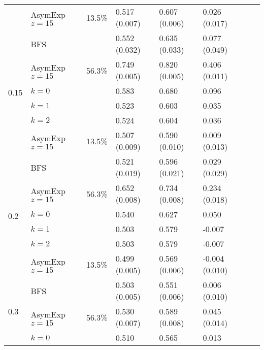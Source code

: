\documentclass[a4paper,final,notitlepage,11pt,svgnames]{scrartcl}
\begin{document}
\begin{table}[htpb]
\begin{tabular}{llllllll}
		                      & AsymExp $z=15$ & 13.5\%       & 0.517 (0.007) & 0.607 (0.006) & 0.026 (0.017)  &               &    \\
		\cmidrule(r){2-6}
		\multirow{6}{*}{0.15} & BFS            &              & 0.552 (0.032) & 0.635 (0.033) & 0.077 (0.049)  &               & \\
		                      & AsymExp $z=15$ & 56.3\%       & 0.749 (0.005) & 0.820 (0.005) & 0.406 (0.011)  &               &    \\
		                      & $k=0$          &              & 0.583         & 0.680         & 0.096          &               & \\
		                      & $k=1$          &              & 0.523         & 0.603         & 0.035          &               & \\
		                      & $k=2$          &              & 0.524         & 0.604         & 0.036          &               & \\
		                      & AsymExp $z=15$ & 13.5\%       & 0.507 (0.009) & 0.590 (0.010) & 0.009 (0.013)  &               &    \\
		\cmidrule(r){2-6}
		\multirow{6}{*}{0.2}  & BFS            &              & 0.521 (0.019) & 0.596 (0.021) & 0.029 (0.029)  &               & \\
		                      & AsymExp $z=15$ & 56.3\%       & 0.652 (0.008) & 0.734 (0.008) & 0.234 (0.018)  &               &    \\
		                      & $k=0$          &              & 0.540         & 0.627         & 0.050          &               & \\
		                      & $k=1$          &              & 0.503         & 0.579         & -0.007         &               & \\
		                      & $k=2$          &              & 0.503         & 0.579         & -0.007         &               & \\
		                      & AsymExp $z=15$ & 13.5\%       & 0.499 (0.005) & 0.569 (0.006) & -0.004 (0.010) &               &    \\
		\cmidrule(r){2-6}
		\multirow{6}{*}{0.3}  & BFS            &              & 0.503 (0.005) & 0.551 (0.006) & 0.006 (0.010)  &               & \\
		                      & AsymExp $z=15$ & 56.3\%       & 0.530 (0.007) & 0.589 (0.008) & 0.045 (0.014)  &               &    \\
		                      & $k=0$          &              & 0.510         & 0.565         & 0.013          &               & \\

\end{tabular}
\end{table}
\end{document}
